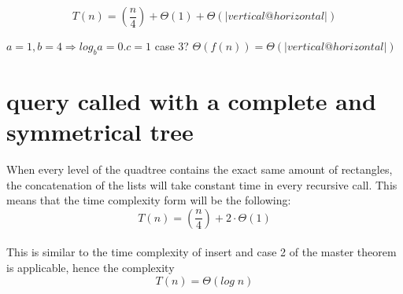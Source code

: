 \documentclass[12pt, a4paper]{article}
\begin{document}
$$T(n)=\left(\frac{n}{4}\right)+\Theta(1)+\Theta(|vertical@horizontal|)$$

$a=1, b=4 \Rightarrow log_ba=0. c = 1$
case 3? $\Theta(f(n))=\Theta(|vertical@horizontal|)$
\\
\section{query called with a complete and symmetrical tree}

When every level of the quadtree contains the exact same amount of rectangles, the concatenation of the lists will take constant time in every recursive call. This means that the time complexity form will be the following: $$T(n)=\left(\frac{n}{4}\right)+2\cdot\Theta(1)$$\\

This is similar to the time complexity of insert and case 2 of the master theorem is applicable, hence the complexity $$T(n)=\Theta(log\;n)$$
\end{document}
